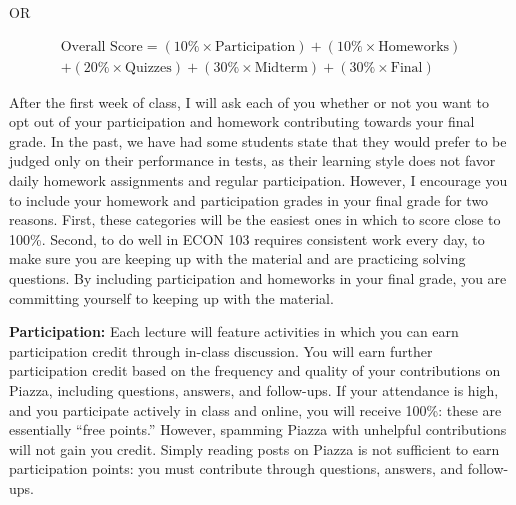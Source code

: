 \documentclass[11pt, letterpaper]{article}
\begin{document}
OR

	\begin{equation*}
	\begin{split}
		\mbox{Overall Score} =
(10\% \times \mbox{Participation})  + 
		 (10\% \times \mbox{Homeworks})  \\
		 + (20\% \times \mbox{Quizzes}) 
		 + (30\% \times \mbox{Midterm}) + (30\% \times \mbox{Final})
	\end{split}
	\end{equation*}
\medskip

After the first week of class, I will ask each of you whether or not you want to opt out of your
participation and homework contributing towards your final grade. In the past, we have had some
students state that they would prefer to be judged only on their performance in tests, as their
learning style does not favor daily homework assignments and regular participation. However,
I encourage you to include your homework and participation grades in your final grade for two
reasons. First, these categories will be the easiest ones in which to score close to 100\%. Second, to
do well in ECON 103 requires consistent work every day, to make sure you are keeping up with the
material and are practicing solving questions. By including participation and homeworks in your
final grade, you are committing yourself to keeping up with the material. %


\medskip



\noindent \textbf{Participation:} Each lecture will feature activities in which you can earn participation credit
through in-class discussion. You will earn further participation credit based on the frequency and
quality of your contributions on Piazza, including questions, answers, and follow-ups. If your
attendance is high, and you participate actively in class and online, you will receive 100\%: these
are essentially “free points.” However, spamming Piazza with unhelpful contributions will not gain
you credit. Simply reading posts on Piazza is not sufficient to earn participation points: you must
contribute through questions, answers, and follow-ups.
\end{document}
